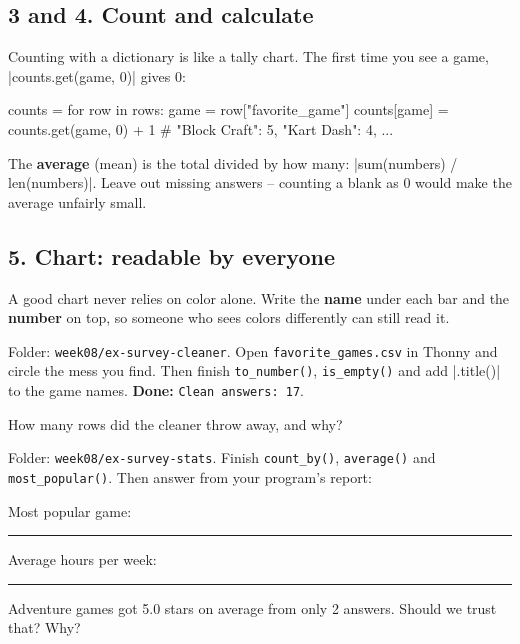 \subsection{3 and 4. Count and calculate}
Counting with a dictionary is like a tally chart. The first time you see a game, \py|counts.get(game, 0)| gives 0:
\begin{pycode}
counts = {}
for row in rows:
    game = row["favorite_game"]
    counts[game] = counts.get(game, 0) + 1
# {"Block Craft": 5, "Kart Dash": 4, ...}
\end{pycode}
The \textbf{average} (mean) is the total divided by how many: \py|sum(numbers) / len(numbers)|. Leave out missing answers -- counting a blank as 0 would make the average unfairly small.

\subsection{5. Chart: readable by everyone}
A good chart never relies on color alone. Write the \textbf{name} under each bar and the \textbf{number} on top, so someone who sees colors differently can still read it.
\begin{center}
\end{center}

\begin{exercise}
Folder: \texttt{week08/ex-survey-cleaner}. Open \texttt{favorite\_games.csv} in Thonny and circle the mess you find. Then finish \texttt{to\_number()}, \texttt{is\_empty()} and add \py|.title()| to the game names. \textbf{Done:} \texttt{Clean answers: 17}.

How many rows did the cleaner throw away, and why? 
\end{exercise}

\begin{exercise}
Folder: \texttt{week08/ex-survey-stats}. Finish \texttt{count\_by()}, \texttt{average()} and \texttt{most\_popular()}. Then answer from your program's report:

Most popular game: \rule{4cm}{0.4pt} \quad Average hours per week: \rule{2cm}{0.4pt}

Adventure games got 5.0 stars on average from only 2 answers. Should we trust that? Why? 
\end{exercise}

